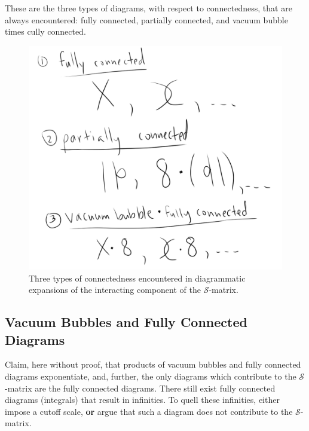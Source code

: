 \noindent These are the three types of diagrams, with respect to connectedness, that are always encountered: fully connected, partially connected, and vacuum bubble times cully connected.

\begin{figure}[H]
	\centering
	\includegraphics[scale=0.6]{images/connectiontypes.png}
	\caption{Three types of connectedness encountered in diagrammatic expansions of the interacting component of the $\mathcal{S}$-matrix.}
\end{figure}
 
\subsection*{Vacuum Bubbles and Fully Connected Diagrams}

\noindent Claim, here without proof, that products of vacuum bubbles and fully connected diagrams exponentiate, and, further, the only diagrams which contribute to the $\mathcal{S}$-matrix are the fully connected diagrams. There still exist fully connected diagrams (integrals) that result in infinities. To quell these infinities, either impose a cutoff scale, \textbf{or} argue that such a diagram does not contribute to the $\mathcal{S}$-matrix. \\

